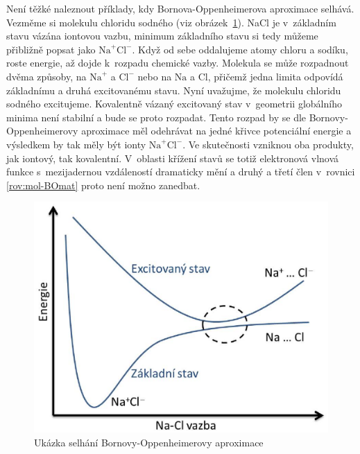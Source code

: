 Není těžké naleznout příklady, kdy Bornova-Oppenheimerova aproximace selhává. Vezměme si molekulu chloridu sodného (viz obrázek~\ref{obr:mol:NaCl disociace}). NaCl je v~základním stavu vázána iontovou vazbu, minimum základního stavu si tedy můžeme přibližně popsat jako $\mathrm{Na}^{+}\mathrm{Cl}^{-}$. Když od sebe oddalujeme atomy chloru a sodíku, roste energie, až dojde k~rozpadu chemické vazby. Molekula se může rozpadnout dvěma způsoby, na $\mathrm{Na}^{+}$ a $\mathrm{Cl}^{-}$ nebo na $\mathrm{Na}$ a $\mathrm{Cl}$, přičemž jedna limita odpovídá základnímu a druhá excitovanému stavu. Nyní uvažujme, že molekulu chloridu sodného excitujeme. Kovalentně vázaný excitovaný stav v~geometrii globálního minima není stabilní a bude se proto rozpadat. Tento rozpad by se dle Bornovy-Oppenheimerovy aproximace měl odehrávat na jedné křivce potenciální energie a výsledkem by tak měly být ionty $\mathrm{Na}^{+}\mathrm{Cl}^{-}$. Ve skutečnosti vzniknou oba produkty, jak iontový, tak kovalentní. V~oblasti křížení stavů se totiž elektronová vlnová funkce s~mezijadernou vzdáleností dramaticky mění a druhý a třetí člen v~rovnici \ref{rov:mol-BOmat} proto není možno zanedbat. 


\begin{figure} [ht]
\centering
\includegraphics[scale=0.5]{obrazky/NaCl_disociace.eps}
\caption[NaCl disociace]{Ukázka selhání Bornovy-Oppenheimerovy aproximace}
\label{obr:mol:NaCl disociace}
\end{figure}


 
